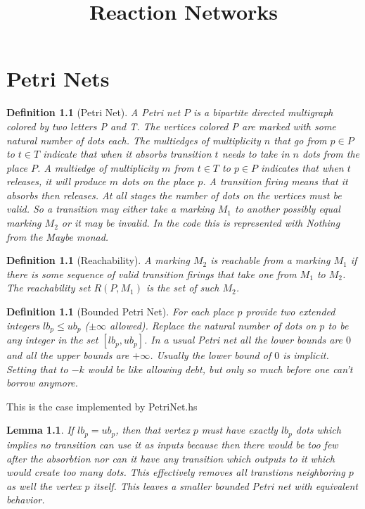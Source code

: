 \documentclass[11pt]{book}
\title{Reaction Networks}
\theoremstyle{change}
\newtheorem{definition}[equation]{Definition}
\newtheorem{lemma}[equation]{Lemma}
\theoremstyle{nonumberplain}
\numberwithin{equation}{section}
\begin{document}
\maketitle
\tableofcontents

\chapter{Petri Nets}

\begin{definition}[Petri Net]
A Petri net $P$ is a bipartite directed multigraph colored by two letters P and T. The vertices colored P are marked with some natural number of dots each. The multiedges of multiplicity $n$ that go from $p \in P$ to $t \in T$ indicate that when it absorbs transition $t$ needs to take in $n$ dots from the place $P$. A multiedge of multiplicity $m$ from $t \in T$ to $p \in P$ indicates that when $t$ releases, it will produce $m$ dots on the place $p$. A transition firing means that it absorbs then releases. At all stages the number of dots on the vertices must be valid. So a transition may either take a marking $M_1$ to another possibly equal marking $M_2$ or it may be invalid. In the code this is represented with Nothing from the Maybe monad.
\end{definition}

\begin{definition}[Reachability]
A marking $M_2$ is reachable from a marking $M_1$ if there is some sequence of valid transition firings that take one from $M_1$ to $M_2$. The reachability set $R(P,M_1)$ is the set of such $M_2$.
\end{definition}

\begin{definition}[Bounded Petri Net]
For each place $p$ provide two extended integers $lb_p \leq ub_p$ ($\pm \infty$ allowed). Replace the natural number of dots on $p$ to be any integer in the set $[lb_p,ub_p]$. In a usual Petri net all the lower bounds are $0$ and all the upper bounds are $+\infty$. Usually the lower bound of $0$ is implicit. Setting that to $-k$ would be like allowing debt, but only so much before one can't borrow anymore.
\end{definition}

This is the case implemented by PetriNet.hs

\begin{lemma}
If $lb_p=ub_p$, then that vertex $p$ must have exactly $lb_p$ dots which implies no transition can use it as inputs because then there would be too few after the absorbtion nor can it have any transition which outputs to it which would create too many dots. This effectively removes all transtions neighboring $p$ as well the vertex $p$ itself. This leaves a smaller bounded Petri net with equivalent behavior.
\end{lemma}
\end{document}
